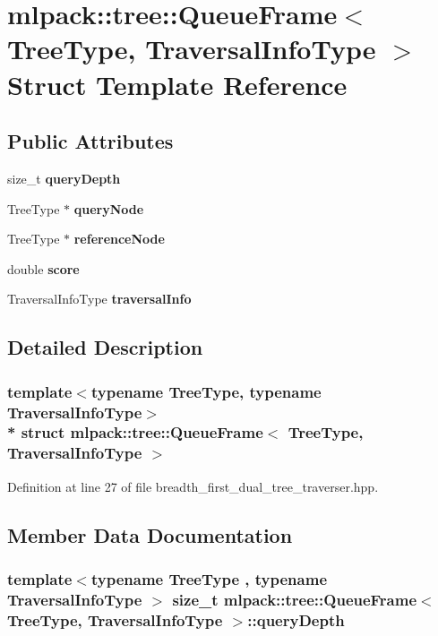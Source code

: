 \section{mlpack\+:\+:tree\+:\+:Queue\+Frame$<$ Tree\+Type, Traversal\+Info\+Type $>$ Struct Template Reference}
\label{structmlpack_1_1tree_1_1QueueFrame}
\subsection*{Public Attributes}
\begin{DoxyCompactItemize}
\item 
size\+\_\+t {\bf query\+Depth}
\item 
Tree\+Type $\ast$ {\bf query\+Node}
\item 
Tree\+Type $\ast$ {\bf reference\+Node}
\item 
double {\bf score}
\item 
Traversal\+Info\+Type {\bf traversal\+Info}
\end{DoxyCompactItemize}


\subsection{Detailed Description}
\subsubsection*{template$<$typename Tree\+Type, typename Traversal\+Info\+Type$>$\\*
struct mlpack\+::tree\+::\+Queue\+Frame$<$ Tree\+Type, Traversal\+Info\+Type $>$}



Definition at line 27 of file breadth\+\_\+first\+\_\+dual\+\_\+tree\+\_\+traverser.\+hpp.



\subsection{Member Data Documentation}
\subsubsection[{query\+Depth}]{\setlength{\rightskip}{0pt plus 5cm}template$<$typename Tree\+Type , typename Traversal\+Info\+Type $>$ size\+\_\+t {\bf mlpack\+::tree\+::\+Queue\+Frame}$<$ Tree\+Type, Traversal\+Info\+Type $>$\+::query\+Depth}\label{structmlpack_1_1tree_1_1QueueFrame_a760f0d74a729c8203b1f9a4c3424720c}


